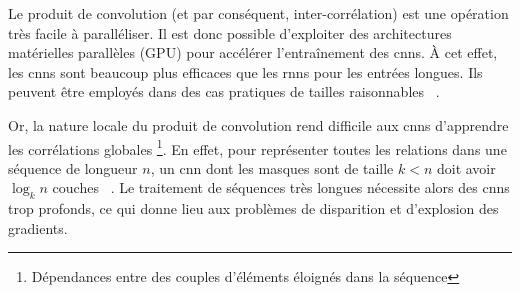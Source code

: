 Le produit de convolution (et par conséquent, inter-corrélation) 
est une opération très facile à paralléliser.
Il est donc possible d'exploiter des architectures matérielles parallèles (GPU) 
pour accélérer l'entraînement des \glspl{cnn}.
À cet effet, les \glspl{cnn} sont beaucoup plus efficaces que les \glspl{rnn} pour les entrées longues. 
Ils peuvent être employés dans des cas pratiques de tailles raisonnables%
~\cite{Li_Zhang_Huang_Wang_Zheng_2016}.

Or, la nature locale du produit de convolution
rend difficile aux \glspl{cnn} d'apprendre les corrélations globales%
\footnote{Dépendances entre des couples d'éléments éloignés dans la séquence}.
En effet, pour représenter toutes les relations dans une séquence de longueur \(n\),
un \gls{cnn} dont les masques sont de taille \(k < n\) doit avoir \(\log_k n\) couches%
~\cite{attention}.
Le traitement de séquences très longues nécessite alors des \glspl{cnn} trop profonds,
ce qui donne lieu aux problèmes de disparition et d'explosion des gradients.